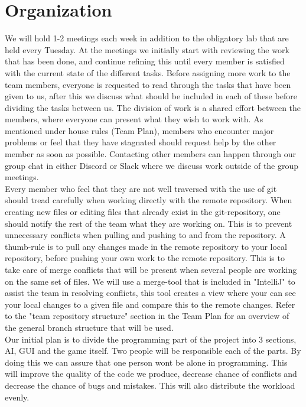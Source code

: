 \documentclass{article}
\begin{document}
    \section{Organization}
    \noindent
    We will hold 1-2 meetings each week in addition to the obligatory lab that are held every Tuesday. At the meetings we initially start with reviewing the work that has been done, and continue refining this until every member is satisfied with the current state of the different tasks. Before assigning more work to the team members, everyone is requested to read through the tasks that have been given to us, after this we discuss what should be included in each of these before dividing the tasks between us. The division of work is a shared effort between the members, where everyone can present what they wish to work with. As mentioned under house rules (Team Plan), members who encounter major problems or feel that they have stagnated should request help by the other member as soon as possible. Contacting other members can happen through our group chat in either Discord or Slack where we discuss work outside of the group meetings. \\

    \noindent
    Every member who feel that they are not well traversed with the use of git should tread carefully when working directly with the remote repository. When creating new files or editing files that already exist in the git-repository, one should notify the rest of the team what they are working on. This is to prevent unnecessary conflicts when pulling and pushing to and from the repository. A thumb-rule is to pull any changes made in the remote repository to your local repository, before pushing your own work to the remote repository. This is to take care of merge conflicts that will be present when several people are working on the same set of files. We will use a merge-tool that is included in "IntelliJ" to assist the team in resolving conflicts, this tool creates a view where your can see your local changes to a given file and compare this to the remote changes. Refer to the "team repository structure" section in the Team Plan for an overview of the general branch structure that will be used. \\

    \noindent
    Our initial plan is to divide the programming part of the project into 3 sections, AI, GUI and the game itself. Two people will be responsible each of the parts. By doing this we can assure that one person wont be alone in programming. This will improve the quality of the code we produce, decrease chance of conflicts and decrease the chance of bugs and mistakes. This will also distribute the workload evenly. \\
\end{document}
